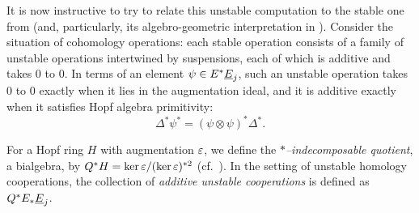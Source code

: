 It is now instructive to try to relate this unstable computation to the stable one from  (and, particularly, its algebro-geometric interpretation in ).  Consider the situation of cohomology operations: each stable operation consists of a family of unstable operations intertwined by suspensions, each of which is additive and takes \(0\) to \(0\).  In terms of an element \(\psi \in E^* \OS{E}{j}\), such an unstable operation takes \(0\) to \(0\) exactly when it lies in the augmentation ideal, and it is additive exactly when it satisfies Hopf algebra primitivity: \[\Delta^* \psi^* = (\psi \otimes \psi)^* \Delta^*.\]
\begin{definition}
For a Hopf ring \(H\) with augmentation \(\varepsilon\), we define the \textit{\(\ast\)--indecomposable quotient}, a bialgebra, by \(Q^* H = \ker \varepsilon / (\ker \varepsilon)^{\ast 2}\) (cf.\ ).  In the setting of unstable homology cooperations, the collection of \textit{additive unstable cooperations} is defined as \(Q^* E_* \OS{E}{j}\).
\end{definition}

